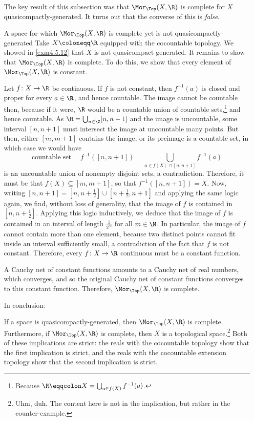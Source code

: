 The key result of this subsection was that $\Mor _{\Top}(X,\R )$ is complete for $X$ quasicompactly-generated.  It turns out that the converse of this is \emph{false}.
\begin{exm}{A space for which $\Mor _{\Top}(X,\R )$ is complete yet is not quasicompactly-generated}{}
Take $X\coloneqq \R$ equipped with the cocountable topology.  We showed in \cref{exm4.5.12} that $X$ is not quasicompact-generated.  It remains to show that $\Mor _{\Top}(X,\R )$ is complete.  To do this, we show that every element of $\Mor _{\Top}(X,\R )$ is constant.

Let $f\colon X\rightarrow \R$ be continuous.  If $f$ is not constant, then $f^{-1}(a)$ is closed and proper for every $a\in \R$, and hence countable.  The image cannot be countable then, because if it were, $\R$ would be a countable union of countable sets,\footnote{Because $\R \eqqcolon X=\bigcup _{a\in f(X)}f^{-1}(a)$.} and hence countable.  As $\R =\bigcup _{n\in \Z}[n,n+1]$ and the image is uncountable, some interval $[n,n+1]$ must intersect the image at uncountable many points.  But then, either $[m,m+1]$ contains the image, or its preimage is a countable set, in which case we would have
\begin{equation*}
\text{countable set}=f^{-1}([n,n+1])=\bigcup _{a\in f(X)\cap [n,n+1]}f^{-1}(a)
\end{equation*}
is an uncountable union of nonempty disjoint sets, a contradiction.  Therefore, it must be that $f(X)\subseteq [m,m+1]$, so that $f^{-1}([n,n+1])=X$.  Now, writing $[n,n+1]=[n,n+\frac{1}{2}]\cup [n+\frac{1}{2},n+1]$ and applying the same logic again, we find, without loss of generality, that the image of $f$ is contained in $[n,n+\frac{1}{2}]$.  Applying this logic inductively, we deduce that the image of $f$ is contained in an interval of length $\frac{1}{2^m}$ for all $m\in \N$.  In particular, the image of $f$ cannot contain more than one element, because two distinct points cannot fit inside an interval sufficiently small, a contradiction of the fact that $f$ is not constant.  Therefore, every $f\colon X\rightarrow \R$ continuous must be a constant function.

A Cauchy net of constant functions amounts to a Cauchy net of real numbers, which converges, and so the original Cauchy net of constant functions converges to this constant function.  Therefore, $\Mor _{\Top}(X,\R )$ is complete.
\end{exm}
In conclusion:
\begin{important}
If a space is quasicompactly-generated, then $\Mor _{\Top}(X,\R )$ is complete.  Furthermore, if $\Mor _{\Top}(X,\R )$ is complete, then $X$ is a topological space.\footnote{Uhm, duh.  The content here is not in the implication, but rather in the counter-example.}  Both of these implications are strict:  the reals with the cocountable topology show that the first implication is strict, and the reals with the cocountable extension topology show that the second implication is strict.
\end{important}

